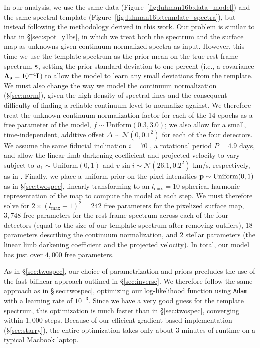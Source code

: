 \documentclass[modern]{aastex631}
\begin{document}
In our analysis, we use the same data (Figure~\ref{fig:luhman16b:data_model}) and the same spectral template (Figure~\ref{fig:luhman16b:template_spectra}), but instead following the methodology derived in this work.
Our problem is similar to that in \S\ref{sec:spot_y1bs}, in which we treat both the spectrum and the surface map as unknowns given continuum-normalized spectra as input.
However, this time we use the template spectrum as the prior mean on the true rest frame spectrum ${\mathbf{s}}$, setting the prior standard deviation to one percent (i.e., a covariance $\boldsymbol{\Lambda}_{\mathbf{s}} = 10^{-4}{\mathbf{I}}$) to allow the model to learn any small deviations from the template.
We must also change the way we model the continuum normalization (\S\ref{sec:norm}), given the high density of spectral lines and the consequent difficulty of finding a reliable continuum level to normalize against.
We therefore treat the unknown continuum normalization factor for each of the 14 epochs as a free parameter of the model, $f \sim \mathrm{Uniform}(0.3, 3.0)$; we also allow for a small, time-independent, additive offset $\Delta \sim \mathcal{N}(0, 0.1^2)$ for each of the four detectors.
We assume the same fiducial inclination $i = 70^\circ$, a rotational period $P = 4.9$ days, and allow the linear limb darkening coefficient and projected velocity to vary subject to $u_1 \sim \mathrm{Uniform}(0, 1)$ and $v \sin i \sim \mathcal{N}(26.1, 0.2^2)$ km/s, respectively, as in \citet{Crossfield2014}.
Finally, we place a uniform prior on the pixel intensities ${\mathbf{p}} \sim \mathrm{Uniform}(0, 1)$ as in \S\ref{sec:twospec}, linearly transforming to an $l_\mathrm{max} = 10$ spherical harmonic representation of the map to compute the model at each step.
We must therefore solve for $2 \times (l_\mathrm{max} + 1)^2 = 242$ free parameters for the pixelized surface map, $3,748$ free parameters for the rest frame spectrum across each of the four detectors (equal to the size of our template spectrum after removing outliers), $18$ parameters describing the continuum normalization, and $2$ stellar parameters (the linear limb darkening coefficient and the projected velocity).
In total, our model has just over $4,000$ free parameters.

As in \S\ref{sec:twospec}, our choice of parametrization and priors precludes the use of the fast bilinear approach outlined in \S\ref{sec:inverse}.
We therefore follow the same approach as in \S\ref{sec:twospec}, optimizing our log-likelihood function using \texttt{Adam} with a learning rate of $10^{-3}$.
Since we have a very good guess for the template spectrum, this optimization is much faster than in \S\ref{sec:twospec}, converging within $1,000$ steps.
Because of our efficient gradient-based implementation (\S\ref{sec:starry}), the entire optimization takes only about 3 minutes of runtime on a typical Macbook laptop.
\end{document}
